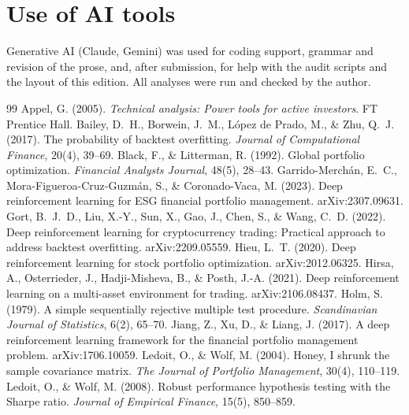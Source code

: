 \documentclass[11pt,a4paper]{article}
\begin{document}
\section*{Use of AI tools}
Generative AI (Claude, Gemini) was used for coding support, grammar and revision of the prose, and, after submission, for help with the audit scripts and the layout of this edition. All analyses were run and checked by the author.
\normalsize

\begin{thebibliography}{99}\small
\setlength{\itemsep}{0.15em}
 Appel, G. (2005). \emph{Technical analysis: Power tools for active investors}. FT Prentice Hall.
 Bailey, D.~H., Borwein, J.~M., López de Prado, M., \& Zhu, Q.~J. (2017). The probability of backtest overfitting. \emph{Journal of Computational Finance}, 20(4), 39--69.
 Black, F., \& Litterman, R. (1992). Global portfolio optimization. \emph{Financial Analysts Journal}, 48(5), 28--43.
 Garrido-Merchán, E.~C., Mora-Figueroa-Cruz-Guzmán, S., \& Coronado-Vaca, M. (2023). Deep reinforcement learning for ESG financial portfolio management. arXiv:2307.09631.
 Gort, B.~J.~D., Liu, X.-Y., Sun, X., Gao, J., Chen, S., \& Wang, C.~D. (2022). Deep reinforcement learning for cryptocurrency trading: Practical approach to address backtest overfitting. arXiv:2209.05559.
 Hieu, L.~T. (2020). Deep reinforcement learning for stock portfolio optimization. arXiv:2012.06325.
 Hirsa, A., Osterrieder, J., Hadji-Misheva, B., \& Posth, J.-A. (2021). Deep reinforcement learning on a multi-asset environment for trading. arXiv:2106.08437.
 Holm, S. (1979). A simple sequentially rejective multiple test procedure. \emph{Scandinavian Journal of Statistics}, 6(2), 65--70.
 Jiang, Z., Xu, D., \& Liang, J. (2017). A deep reinforcement learning framework for the financial portfolio management problem. arXiv:1706.10059.
 Ledoit, O., \& Wolf, M. (2004). Honey, I shrunk the sample covariance matrix. \emph{The Journal of Portfolio Management}, 30(4), 110--119.
 Ledoit, O., \& Wolf, M. (2008). Robust performance hypothesis testing with the Sharpe ratio. \emph{Journal of Empirical Finance}, 15(5), 850--859.

\end{thebibliography}
\end{document}
